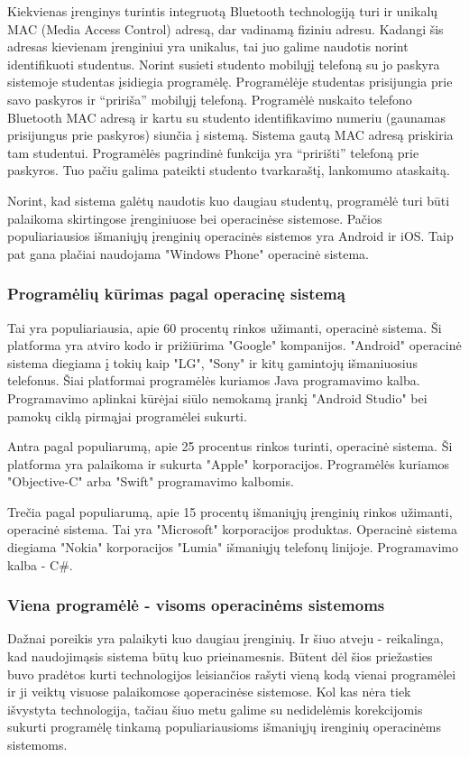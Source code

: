 \documentclass{VUMIFPSkursinis}
\begin{document}
Kiekvienas įrenginys turintis integruotą Bluetooth technologiją turi ir unikalų MAC (Media Access Control) adresą, dar vadinamą fiziniu adresu. Kadangi šis adresas kievienam įrenginiui yra unikalus, tai juo galime naudotis norint identifikuoti studentus. Norint susieti studento mobilųjį telefoną su jo paskyra sistemoje studentas įsidiegia programėlę. Programėlėje studentas prisijungia prie savo paskyros ir “pririša” mobilųjį telefoną. Programėlė nuskaito telefono Bluetooth MAC adresą ir kartu su studento identifikavimo numeriu (gaunamas prisijungus prie paskyros) siunčia į sistemą. Sistema gautą MAC adresą priskiria tam studentui. Programėlės pagrindinė funkcija yra “pririšti” telefoną prie paskyros. Tuo pačiu galima pateikti studento tvarkaraštį, lankomumo ataskaitą.

Norint, kad sistema galėtų naudotis kuo daugiau studentų, programėlė turi būti palaikoma skirtingose įrenginiuose bei operacinėse sistemose. Pačios populiariausios išmaniųjų įrenginių operacinės sistemos yra Android ir iOS. Taip pat gana plačiai naudojama "Windows Phone" operacinė sistema.

\subsubsection{Programėlių kūrimas pagal operacinę sistemą}

Tai yra populiariausia, apie 60 procentų rinkos užimanti, operacinė sistema. Ši platforma yra atviro kodo ir prižiūrima "Google" kompanijos. "Android" operacinė sistema diegiama į tokių kaip "LG", "Sony" ir kitų gamintojų išmaniuosius telefonus. Šiai platformai programėlės kuriamos Java programavimo kalba. Programavimo aplinkai kūrėjai siūlo nemokamą įrankį "Android Studio" bei pamokų ciklą pirmąjai programėlei sukurti.

Antra pagal populiarumą, apie 25 procentus rinkos turinti, operacinė sistema. Ši platforma yra palaikoma ir sukurta "Apple" korporacijos. Programėlės kuriamos "Objective-C" arba "Swift" programavimo kalbomis.

Trečia pagal populiarumą, apie 15 procentų išmaniųjų įrenginių rinkos užimanti, operacinė sistema. Tai yra "Microsoft" korporacijos produktas. Operacinė sistema diegiama "Nokia" korporacijos "Lumia" išmaniųjų telefonų linijoje. Programavimo kalba - C\#.

\subsubsection{Viena programėlė - visoms operacinėms sistemoms}
Dažnai poreikis yra palaikyti kuo daugiau įrenginių. Ir šiuo atveju - reikalinga, kad naudojimąsis sistema būtų kuo prieinamesnis. Būtent dėl šios priežasties buvo pradėtos kurti technologijos leisiančios rašyti vieną kodą vienai programėlei ir ji veiktų visuose palaikomose ąoperacinėse sistemose. Kol kas nėra tiek išvystyta technologija, tačiau šiuo metu galime su nedidelėmis korekcijomis sukurti programėlę tinkamą populiariausioms išmaniųjų irenginių operacinėms sistemoms.
\end{document}
